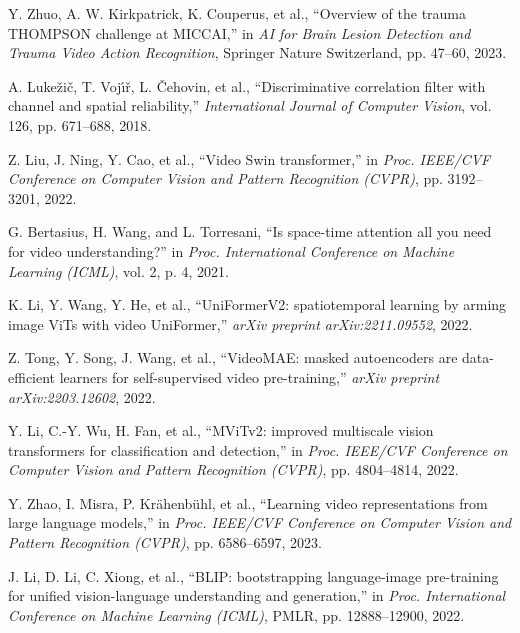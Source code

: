 \documentclass[12pt,a4paper]{report}
\begin{document}
\begin{enumerate}[label={[\arabic*]}, leftmargin=2.5em, itemsep=0.8em]
    \item Y. Zhuo, A. W. Kirkpatrick, K. Couperus, et al., ``Overview of the trauma THOMPSON challenge at MICCAI,'' in \textit{AI for Brain Lesion Detection and Trauma Video Action Recognition}, Springer Nature Switzerland, pp. 47--60, 2023.
    
    \item A. Luke{\v{z}}i{\v{c}}, T. Voj{\'\i}{\v{r}}, L. {\v{C}}ehovin, et al., ``Discriminative correlation filter with channel and spatial reliability,'' \textit{International Journal of Computer Vision}, vol. 126, pp. 671--688, 2018.
    
    \item Z. Liu, J. Ning, Y. Cao, et al., ``Video Swin transformer,'' in \textit{Proc. IEEE/CVF Conference on Computer Vision and Pattern Recognition (CVPR)}, pp. 3192--3201, 2022.
    
    \item G. Bertasius, H. Wang, and L. Torresani, ``Is space-time attention all you need for video understanding?'' in \textit{Proc. International Conference on Machine Learning (ICML)}, vol. 2, p. 4, 2021.
    
    \item K. Li, Y. Wang, Y. He, et al., ``UniFormerV2: spatiotemporal learning by arming image ViTs with video UniFormer,'' \textit{arXiv preprint arXiv:2211.09552}, 2022.
    
    \item Z. Tong, Y. Song, J. Wang, et al., ``VideoMAE: masked autoencoders are data-efficient learners for self-supervised video pre-training,'' \textit{arXiv preprint arXiv:2203.12602}, 2022.
    
    \item Y. Li, C.-Y. Wu, H. Fan, et al., ``MViTv2: improved multiscale vision transformers for classification and detection,'' in \textit{Proc. IEEE/CVF Conference on Computer Vision and Pattern Recognition (CVPR)}, pp. 4804--4814, 2022.
    
    \item Y. Zhao, I. Misra, P. Kr{\"a}henb{\"u}hl, et al., ``Learning video representations from large language models,'' in \textit{Proc. IEEE/CVF Conference on Computer Vision and Pattern Recognition (CVPR)}, pp. 6586--6597, 2023.
    
    \item J. Li, D. Li, C. Xiong, et al., ``BLIP: bootstrapping language-image pre-training for unified vision-language understanding and generation,'' in \textit{Proc. International Conference on Machine Learning (ICML)}, PMLR, pp. 12888--12900, 2022.
    

\end{enumerate}
\end{document}
